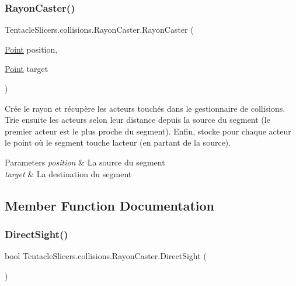 \subsubsection{\texorpdfstring{Rayon\+Caster()}{RayonCaster()}}
{\footnotesize\ttfamily Tentacle\+Slicers.\+collisions.\+Rayon\+Caster.\+Rayon\+Caster (\begin{DoxyParamCaption}\item[{\hyperlink{class_tentacle_slicers_1_1general_1_1_point}{Point}}]{position,  }\item[{\hyperlink{class_tentacle_slicers_1_1general_1_1_point}{Point}}]{target }\end{DoxyParamCaption})}



Crée le rayon et récupère les acteurs touchés dans le gestionnaire de collisions. Trie ensuite les acteurs selon leur distance depuis la source du segment (le premier acteur est le plus proche du segment). Enfin, stocke pour chaque acteur le point où le segment touche l\textquotesingle{}acteur (en partant de la source). 


\begin{DoxyParams}{Parameters}
{\em position} & La source du segment \\
\hline
{\em target} & La destination du segment \\
\hline
\end{DoxyParams}


\subsection{Member Function Documentation}
\mbox{\label{class_tentacle_slicers_1_1collisions_1_1_rayon_caster_aa9938228630292ef5142e87968d336d7}} 
\subsubsection{\texorpdfstring{Direct\+Sight()}{DirectSight()}}
{\footnotesize\ttfamily bool Tentacle\+Slicers.\+collisions.\+Rayon\+Caster.\+Direct\+Sight (\begin{DoxyParamCaption}{ }\end{DoxyParamCaption})}




